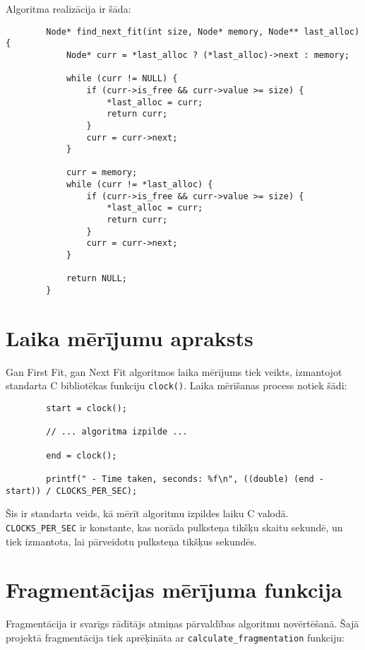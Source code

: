 \documentclass{report}
\begin{document}
	Algoritma realizācija ir šāda:
	
	\begin{verbatim}
		Node* find_next_fit(int size, Node* memory, Node** last_alloc) {
			Node* curr = *last_alloc ? (*last_alloc)->next : memory;
			
			while (curr != NULL) {
				if (curr->is_free && curr->value >= size) {
					*last_alloc = curr;
					return curr;
				}
				curr = curr->next;
			}
			
			curr = memory;
			while (curr != *last_alloc) {
				if (curr->is_free && curr->value >= size) {
					*last_alloc = curr;
					return curr;
				}
				curr = curr->next;
			}
			
			return NULL; 
		}
	\end{verbatim}
	
	\section{Laika mērījumu apraksts}
	
	Gan First Fit, gan Next Fit algoritmos laika mērījums tiek veikts, izmantojot standarta C bibliotēkas funkciju \texttt{clock()}. Laika mērīšanas process notiek šādi:
	
	\begin{verbatim}
		start = clock();
		
		// ... algoritma izpilde ...
		
		end = clock();
		
		printf(" - Time taken, seconds: %f\n", ((double) (end - start)) / CLOCKS_PER_SEC);
	\end{verbatim}
	
	Šis ir standarta veids, kā mērīt algoritmu izpildes laiku C valodā. \texttt{CLOCKS\_PER\_SEC} ir konstante, kas norāda pulksteņa tikšķu skaitu sekundē, un tiek izmantota, lai pārveidotu pulksteņa tikšķus sekundēs.
	
	\section{Fragmentācijas mērījuma funkcija}
	
	Fragmentācija ir svarīgs rādītājs atmiņas pārvaldības algoritmu novērtēšanā. Šajā projektā fragmentācija tiek aprēķināta ar \texttt{calculate\_fragmentation} funkciju:
	
\end{document}
